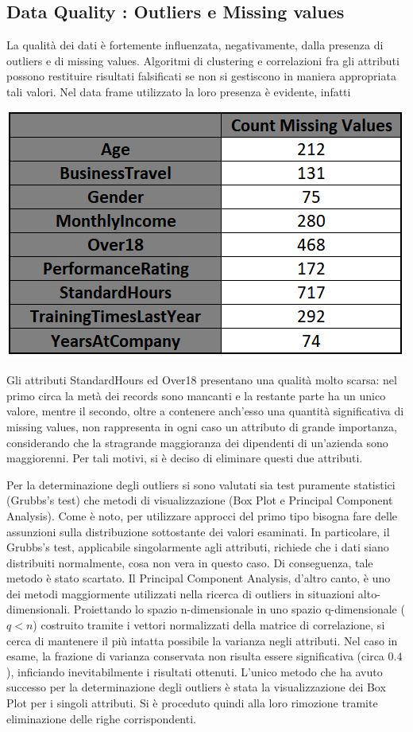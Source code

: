 \documentclass[english]{article}
\begin{document}
\subsection{Data Quality : Outliers e Missing values}
La qualità dei dati è fortemente influenzata, negativamente, dalla presenza di outliers e di missing values. Algoritmi di clustering e correlazioni fra gli attributi possono restituire risultati falsificati se non si gestiscono in maniera appropriata tali valori. 
Nel data frame utilizzato la loro presenza è evidente, infatti

\begin{center}
\includegraphics[scale=1]{missingvalues.png}
\end{center}
Gli attributi StandardHours ed Over18 presentano una qualità molto scarsa: nel primo circa la metà dei records sono mancanti e la restante parte ha un unico valore, mentre il secondo, oltre a contenere anch'esso una quantità significativa di missing values, non rappresenta in ogni caso un attributo di grande importanza, considerando che la stragrande maggioranza dei dipendenti di un'azienda sono maggiorenni. Per tali motivi, si è deciso di eliminare questi due attributi.

Per la determinazione degli outliers si sono valutati sia test puramente statistici (Grubbs's test) che metodi di visualizzazione (Box Plot e Principal Component Analysis). Come è noto, per utilizzare approcci del primo tipo bisogna fare delle assunzioni sulla distribuzione sottostante dei valori esaminati. In particolare, il Grubbs's test, applicabile singolarmente agli attributi, richiede che i dati siano distribuiti normalmente, cosa non vera in questo caso. Di conseguenza, tale metodo è stato scartato. 
Il Principal Component Analysis, d'altro canto, è uno dei metodi maggiormente utilizzati nella ricerca di outliers in situazioni alto-dimensionali. Proiettando lo spazio n-dimensionale in uno spazio q-dimensionale ($q<n$) costruito tramite i vettori normalizzati della matrice di correlazione, si cerca di mantenere il più intatta possibile la varianza negli attributi. Nel caso in esame, la frazione di varianza conservata non risulta essere significativa (circa $0.4$), inficiando inevitabilmente i risultati ottenuti.
L'unico metodo che ha avuto successo per la determinazione degli outliers è stata la visualizzazione dei Box Plot per i singoli attributi. Si è proceduto quindi alla loro rimozione tramite eliminazione delle righe corrispondenti.
\end{document}
